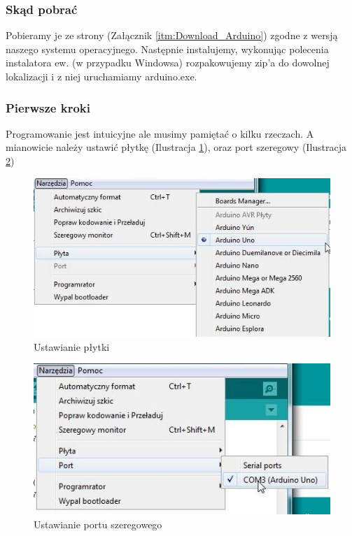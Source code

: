\documentclass[a4paper,12pt, twoside]{article}
\begin{document}
	\subsubsection{Skąd pobrać}
	Pobieramy je ze strony (Załącznik \ref{itm:Download_Arduino}) zgodne z wersją naszego systemu operacyjnego. Następnie instalujemy, wykonując polecenia instalatora
	ew. (w przypadku Windowsa) rozpakowujemy zip'a do dowolnej lokalizacji i z niej uruchamiamy arduino.exe.
\subsubsection{Pierwsze kroki}
Programowanie jest intuicyjne ale musimy pamiętać o kilku rzeczach. A mianowicie należy ustawić płytkę (Ilustracja \ref{fig:plytka}), oraz port szeregowy (Ilustracja \ref{fig:port})%


\begin{figure}[h]  
  \includegraphics[scale=0.7]{arduino-ustawPlytke.jpg}
  \caption{Ustawianie płytki}
  \label{fig:plytka}
	\end{figure}
	\begin{figure}[h]
  \includegraphics[scale=0.7]{arduino-ustawPort.jpg}
  \caption{Ustawianie portu szeregowego}
  \label{fig:port}
\end{figure}
\end{document}
